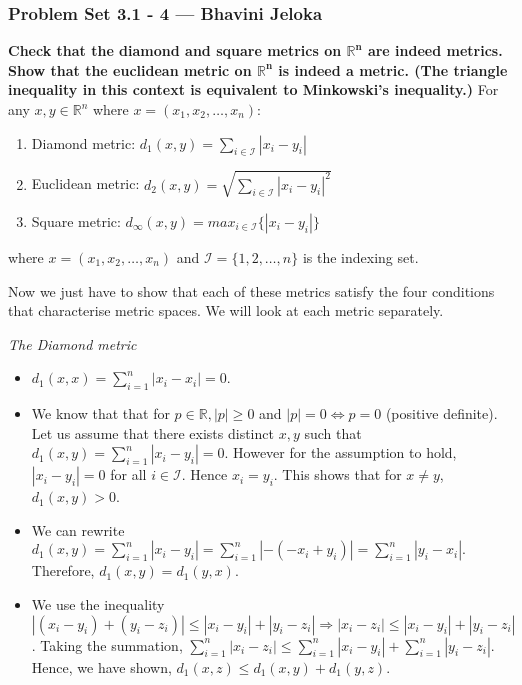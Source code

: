 \begin{frame}{}
\frametitle{Problem Set 3.1 - 4 --- Bhavini Jeloka}
\textbf{Check that the diamond and square metrics on $\bm{\mathbb{R}^n}$ are
indeed metrics. Show that the euclidean metric on $\bm{\mathbb{R}^n}$ is indeed
a metric. (The triangle inequality in this context is equivalent to Minkowski’s
inequality.)}\hfill\break
\hfill\break
For any ${x},{y} \in \mathbb{R}^n $ where $x = (x_1, x_2, \ldots,x_n)$: 
\begin{enumerate}
    \item Diamond metric: $d_1({x},{y}) = \sum_{i\in \mathcal{I}} |x_i - y_i| $
    \item Euclidean metric: $d_2({x},{y}) = \sqrt{\sum_{i\in \mathcal{I}} |x_i -
    y_i|^2} $
    \item Square metric: $d_{\infty}({x},{y}) = max_{i\in \mathcal{I}}\{|x_i -
    y_i|\}$
\end{enumerate}
where \(x = (x_1, x_2, \ldots, x_n)\) and \(\mathcal{I} = \{1, 2, \ldots, n\}\)
is the indexing set. \hfill\break

Now we just have to show that each of these metrics satisfy the four conditions
that characterise metric spaces. We will look at each metric separately.
\end{frame}

\begin{frame}
\textit{The Diamond metric}\hfill\break
\begin{itemize}
        \item $d_1(x,x) = \sum_{i=1}^{n} |x_i - x_i| = 0$.
        \hfill\break
    \pause
    \item  We know that that
    for $p \in \mathbb{R}, |p|\geq 0$ and $|p| = 0 \iff p = 0$ (positive
    definite). \hfill\break
    \hfill\break
    Let us assume that there exists distinct $x,y$ such that $d_1(x,y) = \sum_{i=1}^{n} |x_i - y_i| = 0$.\hfill\break
    \hfill\break
    However for the assumption to hold, $|x_i - y_i| = 0$ for all
    $i \in \mathcal{I}$. Hence $x_i = y_i$. This
    shows that for $x\neq y$, $d_1(x,y)>0$.
\end{itemize}
\end{frame}

\begin{frame}{}
\begin{itemize}
    \item We can rewrite $d_1(x,y) = \sum_{i=1}^{n} |x_i - y_i| = \sum_{i=1}^{n}
    |- (- x_i + y_i)| = \sum_{i=1}^{n} |y_i -
    x_i |.$ Therefore, $d_1(x,y) = d_1(y,x).$ \hfill\break
    \pause
    \item We use the inequality $|(x_i - y_i) + (y_i - z_i)| \leq |x_i -
    y_i| + |y_i - z_i| \Rightarrow |x_i - z_i| \leq |x_i - y_i| + |y_i - z_i|$.\hfill\break
    \hfill\break
    Taking the summation, $\sum_{i=1}^{n}|x_i - z_i| \leq \sum_{i=1}^{n}|x_i -
    y_i| + \sum_{i=1}^{n}|y_i - z_i|$. \\
    Hence, we have shown, $d_1(x,z) \leq
    d_1(x,y)+d_1(y,z).$
\end{itemize}
\end{frame}

